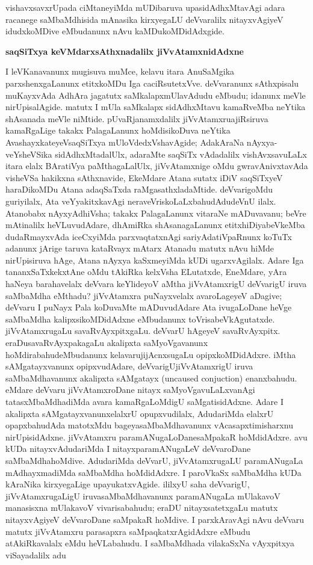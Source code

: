 vishavxsavxrUpada ciMtaneyiMda mUDibaruva upasidAdhxMtavAgi adara racanege saMbaMdhisida mAnasika kirxyegaLU deVvaralilx nitayxvAgiyeV idudxkoMDive eMbudanunx nAvu kaMDukoMDidAdxgide.

\smallskip
\begin{center}
{\Large\bf saqSiTxya keVMdarxsAthxnadalilx jiVvAtamxnidAdxne}
\end{center}

I leVKanavanunx mugisuva muMce, kelavu itara AnuSaMgika parxshenxgaLanunx etitx\-koMDu Iga caciRsutetxVve. deVvaranunx sAthxpisalu muKayxvAda AdhAra jagatutx saMkalapx\-mUlavAdudu eMbudu; idanunx meVle nirUpisalAgide. matutx I mUla saMkalapx sidAdhxMtavu kamaRveMba neYtika shAsanada meVle niMtide. pUvaRjanamxdalilx jiVvAtamxru\break ajiRsiruva kamaRgaLige takakx PalagaLanunx hoMdisikoDuva neYtika AvashayxkateyeV\break saqSiTxya mUloVdedxVshavAgide; AdakAraNa nAyxya-veYsheVSika sidAdhxMtadalUlx, ada\-raMte saqSiTx vAdadalilx vishAvxsavuLaLx itara elalx BAratiVya paMthagaLalUlx, jiVvAtamxnige oMdu gwravAnivxtavAda visheVSa hakikxna sAthxnavide, EkeMdare Atana sutatx iDiV saqSiTxyeV haraDikoMDu Atana adaqSaTxda raMgasathxladaMtide. deVvarigoMdu guriyilalx, Ata veYya\-kitxkavAgi neraveVriskoLaLxbahudAdudeVnU ilalx. Atanobabx nAyxyAdhiVsha; takakx Pala\-gaLanunx vitaraNe mADuvavanu; beVre mAtinalilx heVLuvudAdare, dhAmiRka shAsana\-gaLanunx etitxhiDiyabeVkeMba dudaRmayxvAda iceCxyiMda parxvaqtatxnAgi sariyAda\break \hbox{tiVpaRnunx} koTuTx adanunx jArige taruva kataRvayx mAtarx Atanadu matutx nAvu hiMde nirUpisiruva hAge, Atana nAyxya kaSxmeyiMda kUDi ugarxvAgilalx. Adare Iga tananxSaTxkekxtAne oMdu tAkiRka kelxVsha ELutatxde, EneMdare, yAra haNeya barahavelalx deVvara keYlideyoV aMtha jiVvAtamxrigU deVvarigU iruva saMbaMdha eMthadu? jiVvAtamxra puNayxvelalx avaroLageyeV aDagive; deVvaru I puNayx Pala koDuvaMte mADuvu\-dAdare Ata ivugaLoDane heVge saMbaMdha kalipxsikoMDidAdxne eMbudanunx toVrisa\-beVkAgutatxde. jiVvAtamxrugaLu savaRvAyxpitxgaLu. deVvarU hAgeyeV savaRvAyxpitx. eraDu\break savaRvAyxpakagaLu akalipxta saMyoVgavanunx hoMdirabahudeMbudanunx kelavaru\break jijAcnxsugaLu opipxkoMDidAdxre. iMtha sAMgatayxvanunx opipxvudAdare, deVvarigU\break jiVvAtamxrigU iruva saMbaMdhavanunx akalipxta sAMgatayx {\rm(uncaused conjuction)} enanxbahudu. eMdare deVvaru jiVvAtamxroDane nitayx saMyoVgavuLaLxvanAgi tatasxM\-baMdha\-diMda avara kamaRgaLoMdigU saMgatisidAdxne. Adare I akalipxta sAMgatayxvanunx\break elalxrU opupxvudilalx, AdudariMda elalxrU opapxbahudAda matotxMdu bageya\break saMbaMdha\-vanunx vAcasapxtimisharxnu nirUpisidAdxne. jiVvAtamxru paramANugaLoDane\break saMpakaR hoMdidAdxre. avu kUDa nitayxvAdudariMda I nitayxparamANugaLeV deVva\-roDane saMbaMdhahoMdive. AdudariMda deVvarU, jiVvAtamxrugaLU paramANu\-gaLa mAdhayxmadiMda saMbaMdha hoMdidAdxre. I paroVkaSx saMbaMdha kUDa kAraNika kirxye\-gaLige upayukatxvAgide. ililxyU saha deVvarigU, jiVvAtamxrugaLigU iruva\break saMbaMdhavanunx paramANugaLa mUlakavoV manasisxna mUlakavoV vivarisabahudu; eraDU nitayxsatetxgaLu matutx nitayxvAgiyeV deVvaroDane saMpakaR hoMdive. I parxkAra\-vAgi nAvu deVvaru matutx jiVvAtamxru parasapxra saMpaqkatxrAgidAdxre eMbudu atAkiRka\-valalx eMdu heVLabahudu. I saMbaMdhada vilakaSxNa vAyxpitxya viSayadalilx adu 
